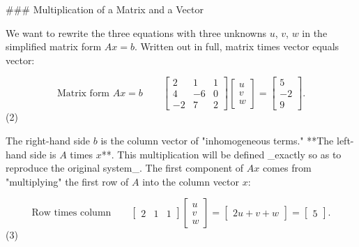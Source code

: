### Multiplication of a Matrix and a Vector

We want to rewrite the three equations with three unknowns \(u\), \(v\), \(w\) in the simplified matrix form \(Ax=b\). Written out in full, matrix times vector equals vector:

\[\text{{Matrix form }}Ax=b\qquad\begin{bmatrix}2&1&1\\ 4&-6&0\\ -2&7&2\end{bmatrix}\begin{bmatrix}u\\ v\\ w\end{bmatrix}=\begin{bmatrix}5\\ -2\\ 9\end{bmatrix}.\] (2)

The right-hand side \(b\) is the column vector of "inhomogeneous terms." **The left-hand side is \(A\) times \(x\)**. This multiplication will be defined _exactly so as to reproduce the original system_. The first component of \(Ax\) comes from "multiplying" the first row of \(A\) into the column vector \(x\):

\[\text{{Row times column}}\qquad\begin{bmatrix}2&1&1\end{bmatrix}\begin{bmatrix} u\\ v\\ w\end{bmatrix}=\begin{bmatrix}2u+v+w\end{bmatrix}=\begin{bmatrix}5\end{bmatrix}.\] (3) 